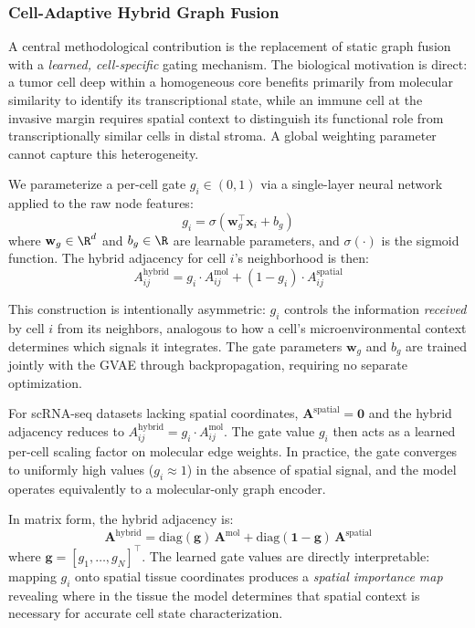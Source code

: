 \documentclass{article}
\newcommand{\sigmoid}{\sigma}
\begin{document}
\subsubsection{Cell-Adaptive Hybrid Graph Fusion}
\label{sec:adaptive_fusion}

A central methodological contribution is the replacement of static graph fusion with a \textit{learned, cell-specific} gating mechanism. The biological motivation is direct: a tumor cell deep within a homogeneous core benefits primarily from molecular similarity to identify its transcriptional state, while an immune cell at the invasive margin requires spatial context to distinguish its functional role from transcriptionally similar cells in distal stroma. A global weighting parameter cannot capture this heterogeneity.

We parameterize a per-cell gate $g_i \in (0, 1)$ via a single-layer neural network applied to the raw node features:
\begin{equation}
    g_i = \sigmoid(\mathbf{w}_g^\top \mathbf{x}_i + b_g)
    \label{eq:gate}
\end{equation}
where $\mathbf{w}_g \in \R^d$ and $b_g \in \R$ are learnable parameters, and $\sigmoid(\cdot)$ is the sigmoid function. The hybrid adjacency for cell $i$'s neighborhood is then:
\begin{equation}
    A^{\text{hybrid}}_{ij} = g_i \cdot A^{\text{mol}}_{ij} + (1 - g_i) \cdot A^{\text{spatial}}_{ij}
    \label{eq:hybrid}
\end{equation}

This construction is intentionally asymmetric: $g_i$ controls the information \textit{received} by cell $i$ from its neighbors, analogous to how a cell's microenvironmental context determines which signals it integrates. The gate parameters $\mathbf{w}_g$ and $b_g$ are trained jointly with the GVAE through backpropagation, requiring no separate optimization.

For scRNA-seq datasets lacking spatial coordinates, $\mathbf{A}^{\text{spatial}} = \mathbf{0}$ and the hybrid adjacency reduces to $A^{\text{hybrid}}_{ij} = g_i \cdot A^{\text{mol}}_{ij}$. The gate value $g_i$ then acts as a learned per-cell scaling factor on molecular edge weights. In practice, the gate converges to uniformly high values ($g_i \approx 1$) in the absence of spatial signal, and the model operates equivalently to a molecular-only graph encoder.

In matrix form, the hybrid adjacency is:
\begin{equation}
    \mathbf{A}^{\text{hybrid}} = \text{diag}(\mathbf{g}) \, \mathbf{A}^{\text{mol}} + \text{diag}(\mathbf{1} - \mathbf{g}) \, \mathbf{A}^{\text{spatial}}
    \label{eq:hybrid_matrix}
\end{equation}
where $\mathbf{g} = [g_1, \ldots, g_N]^\top$. The learned gate values are directly interpretable: mapping $g_i$ onto spatial tissue coordinates produces a \textit{spatial importance map} revealing where in the tissue the model determines that spatial context is necessary for accurate cell state characterization.
\end{document}
